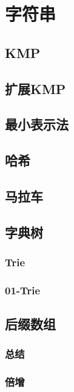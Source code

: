 \documentclass[10pt,a4paper]{article}
\begin{document}
\section{字符串}
\subsection{KMP}

\subsection{扩展KMP}

\subsection{最小表示法}

\subsection{哈希}

\subsection{马拉车}

\subsection{字典树}
\subsubsection{Trie}

\subsubsection{01-Trie}

\subsection{后缀数组}
\subsubsection{总结}
\begin{spacing}{1.5}

\end{spacing}
\subsubsection{倍增}

\end{document}
